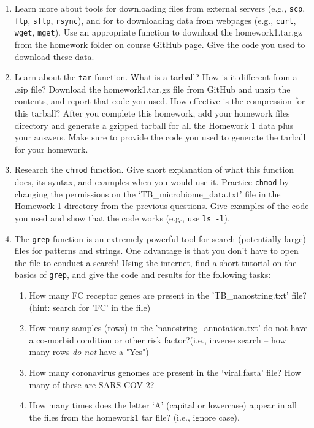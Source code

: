 \documentclass[
]{article}
\begin{document}
\begin{enumerate}
    \item  Learn more about tools for downloading files from external servers (e.g., \texttt{scp}, \texttt{ftp}, \texttt{sftp}, \texttt{rsync}), and for to downloading data from webpages (e.g., \texttt{curl}, \texttt{wget}, \texttt{mget}). Use an appropriate function to download the homework1.tar.gz from the homework folder on course GitHub page. Give the code you used to download these data. 
    \item \label{tar} Learn about the \texttt{tar} function. What is a tarball? How is it different from a .zip file? Download the homework1.tar.gz file from GitHub and unzip the contents, and report that code you used. How effective is the compression for this tarball? After you complete this homework, add your homework files directory and generate a gzipped tarball for all the Homework 1 data plus your answers. Make sure to provide the code you used to generate the tarball for your homework. 
    \item Research the \texttt{chmod} function. Give short explanation of what this function does, its syntax, and examples when you would use it. Practice \texttt{chmod} by changing the permissions on the `TB\_microbiome\_data.txt' file in the Homework 1 directory from the previous questions. Give examples of the code you used and show that the code works (e.g., use \texttt{ls -l}). 
    \item  The \texttt{grep} function is an extremely powerful tool for search (potentially large) files for patterns and strings. One advantage is that you don't have to open the file to conduct a search! Using the internet, find a short tutorial on the basics of \texttt{grep}, and give the code and results for the following tasks: 
        \begin{enumerate}
        \item How many FC receptor genes are present in the 'TB\_nanostring.txt' file? (hint: search for 'FC' in the file)
        \item How many samples (rows) in the 'nanostring\_annotation.txt' do not have a co-morbid condition or other risk factor?(i.e., inverse search -- how many rows {\it do not} have a "Yes")
        \item How many coronavirus genomes are present in the `viral.fasta' file? How many of these are SARS-COV-2?  
        \item How many times does the letter `A' (capital or lowercase) appear in all the files from the homework1 tar file? (i.e., ignore case).

\end{enumerate}
\end{enumerate}
\end{document}
